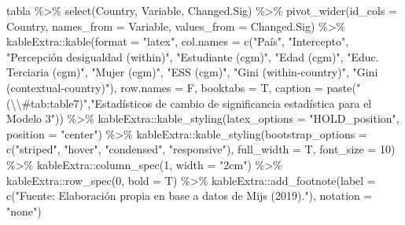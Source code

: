 \documentclass[
  12pt,
  a4paper,
]{article}
\newenvironment{Shaded}{\begin{snugshade}}{\end{snugshade}}
\newcommand{\AttributeTok}[1]{\textcolor[rgb]{0.77,0.63,0.00}{#1}}
\newcommand{\DecValTok}[1]{\textcolor[rgb]{0.00,0.00,0.81}{#1}}
\newcommand{\FunctionTok}[1]{\textcolor[rgb]{0.00,0.00,0.00}{#1}}
\newcommand{\NormalTok}[1]{#1}
\newcommand{\SpecialCharTok}[1]{\textcolor[rgb]{0.00,0.00,0.00}{#1}}
\newcommand{\StringTok}[1]{\textcolor[rgb]{0.31,0.60,0.02}{#1}}
\begin{document}
\begin{Shaded}
\begin{Highlighting}[]
\NormalTok{tabla }\SpecialCharTok{\%\textgreater{}\%} 
  \FunctionTok{select}\NormalTok{(Country,  Variable, Changed.Sig) }\SpecialCharTok{\%\textgreater{}\%} 
  \FunctionTok{pivot\_wider}\NormalTok{(}\AttributeTok{id\_cols =}\NormalTok{ Country,}
              \AttributeTok{names\_from =}\NormalTok{ Variable,}
              \AttributeTok{values\_from =}\NormalTok{ Changed.Sig) }\SpecialCharTok{\%\textgreater{}\%} 
\NormalTok{  kableExtra}\SpecialCharTok{::}\FunctionTok{kable}\NormalTok{(}\AttributeTok{format =} \StringTok{"latex"}\NormalTok{, }
                    \AttributeTok{col.names =} \FunctionTok{c}\NormalTok{(}\StringTok{"País"}\NormalTok{, }\StringTok{"Intercepto"}\NormalTok{, }\StringTok{"Percepción desigualdad (within)"}\NormalTok{, }\StringTok{"Estudiante (cgm)"}\NormalTok{, }\StringTok{"Edad (cgm)"}\NormalTok{, }\StringTok{"Educ. Terciaria (cgm)"}\NormalTok{, }\StringTok{"Mujer (cgm)"}\NormalTok{, }\StringTok{"ESS (cgm)"}\NormalTok{, }\StringTok{"Gini (within{-}country)"}\NormalTok{, }\StringTok{"Gini (contextual{-}country)"}\NormalTok{),}
                    \AttributeTok{row.names =}\NormalTok{ F,}
                    \AttributeTok{booktabs =}\NormalTok{ T, }
                    \AttributeTok{caption =} \FunctionTok{paste}\NormalTok{(}\StringTok{"(}\SpecialCharTok{\textbackslash{}\textbackslash{}}\StringTok{\#tab:table7)"}\NormalTok{,}\StringTok{"Estadísticos de cambio de significancia estadística para el Modelo 3"}\NormalTok{)) }\SpecialCharTok{\%\textgreater{}\%} 
\NormalTok{  kableExtra}\SpecialCharTok{::}\FunctionTok{kable\_styling}\NormalTok{(}\AttributeTok{latex\_options =} \StringTok{"HOLD\_position"}\NormalTok{, }
                            \AttributeTok{position =} \StringTok{"center"}\NormalTok{) }\SpecialCharTok{\%\textgreater{}\%}
\NormalTok{  kableExtra}\SpecialCharTok{::}\FunctionTok{kable\_styling}\NormalTok{(}\AttributeTok{bootstrap\_options =} \FunctionTok{c}\NormalTok{(}\StringTok{"striped"}\NormalTok{, }\StringTok{"hover"}\NormalTok{, }\StringTok{"condensed"}\NormalTok{, }\StringTok{"responsive"}\NormalTok{), }\AttributeTok{full\_width =}\NormalTok{ T, }\AttributeTok{font\_size =} \DecValTok{10}\NormalTok{) }\SpecialCharTok{\%\textgreater{}\%} 
\NormalTok{  kableExtra}\SpecialCharTok{::}\FunctionTok{column\_spec}\NormalTok{(}\DecValTok{1}\NormalTok{, }\AttributeTok{width =} \StringTok{"2cm"}\NormalTok{) }\SpecialCharTok{\%\textgreater{}\%}
\NormalTok{  kableExtra}\SpecialCharTok{::}\FunctionTok{row\_spec}\NormalTok{(}\DecValTok{0}\NormalTok{, }\AttributeTok{bold =}\NormalTok{ T) }\SpecialCharTok{\%\textgreater{}\%} 
\NormalTok{  kableExtra}\SpecialCharTok{::}\FunctionTok{add\_footnote}\NormalTok{(}\AttributeTok{label =} \FunctionTok{c}\NormalTok{(}\StringTok{"Fuente: Elaboración propia en base a datos de Mijs (2019)."}\NormalTok{), }\AttributeTok{notation =} \StringTok{"none"}\NormalTok{)}
\end{Highlighting}
\end{Shaded}
\end{document}
